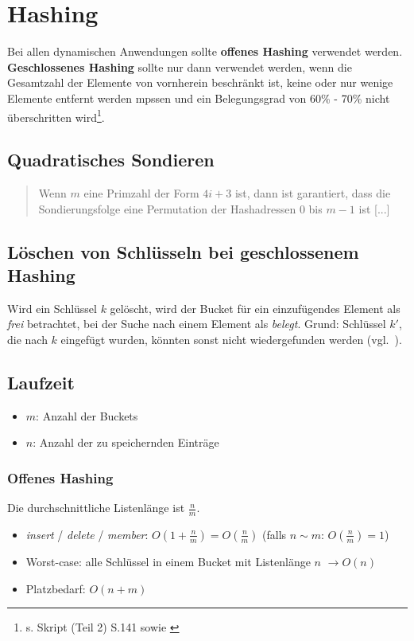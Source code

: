 \section{Hashing}

Bei allen dynamischen Anwendungen sollte \textbf{offenes Hashing} verwendet werden.\\
\textbf{Geschlossenes Hashing} sollte nur dann verwendet werden, wenn die Gesamtzahl der Elemente von vornherein beschränkt ist, keine oder nur wenige Elemente entfernt werden mpssen und ein Belegungsgrad von 60\% - 70\% nicht überschritten wird\footnote{s. Skript (Teil 2) S.141 sowie \cite[126]{GD18d}}.

\subsection{Quadratisches Sondieren}

\blockquote[{\cite[207]{OW17d}}]{
Wenn $m$ eine Primzahl der Form $4i+3$ ist, dann ist garantiert, dass die Sondierungsfolge eine Permutation der Hashadressen 0 bis $m-1$ ist [...]
}

\subsection{Löschen von Schlüsseln bei geschlossenem Hashing}
Wird ein Schlüssel $k$ gelöscht, wird der Bucket für ein einzufügendes Element als \textit{frei} betrachtet, bei der Suche nach einem Element als \textit{belegt}. Grund: Schlüssel $k'$, die nach $k$ eingefügt wurden, könnten sonst nicht wiedergefunden werden (vgl.~\cite[203]{OW17d}).

\subsection{Laufzeit}

\begin{itemize}
    \item $m$: Anzahl der Buckets
    \item $n$: Anzahl der zu speichernden Einträge
\end{itemize}

\subsubsection{Offenes Hashing}

\noindent
Die durchschnittliche Listenlänge ist $\frac{n}{m}$.

\begin{itemize}
    \item \textit{insert} / \textit{delete} / \textit{member}: $O(1 + \frac{n}{m}) = O(\frac{n}{m})$ (falls $n \sim m$: $O(\frac{n}{m}) = 1$)
    \item Worst-case: alle Schlüssel in einem Bucket mit Listenlänge $n$ $\rightarrow O(n)$
    \item Platzbedarf: $O(n + m)$
\end{itemize}

